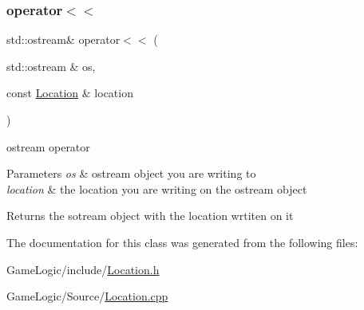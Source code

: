 \subsubsection{\texorpdfstring{operator$<$$<$}{operator<<}}
{\footnotesize\ttfamily std\+::ostream\& operator$<$$<$ (\begin{DoxyParamCaption}\item[{std\+::ostream \&}]{os,  }\item[{const \hyperlink{classroadfighter_1_1Location}{Location} \&}]{location }\end{DoxyParamCaption})\hspace{0.3cm}{\ttfamily [friend]}}

ostream operator 
\begin{DoxyParams}{Parameters}
{\em os} & ostream object you are writing to \\
\hline
{\em location} & the location you are writing on the ostream object \\
\hline
\end{DoxyParams}
\begin{DoxyReturn}{Returns}
the sotream object with the location wrtiten on it 
\end{DoxyReturn}


The documentation for this class was generated from the following files\+:\begin{DoxyCompactItemize}
\item 
Game\+Logic/include/\hyperlink{Location_8h}{Location.\+h}\item 
Game\+Logic/\+Source/\hyperlink{Location_8cpp}{Location.\+cpp}\end{DoxyCompactItemize}
